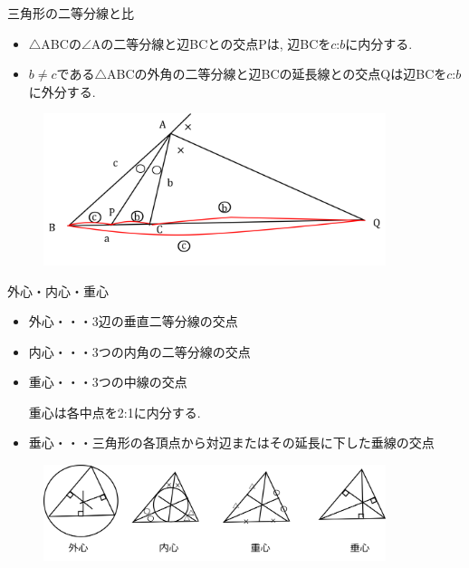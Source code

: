 \documentclass[aspectratio=169, 12pt]{beamer} %
\begin{document}
\begin{frame}{三角形の二等分線と比}
    \begin{itemize}
        \item $\triangle $ABCの$\angle $Aの二等分線と辺BCとの交点Pは, 辺BCを$c$\space:\space$b$に内分する.
        \item $b\neq c$である$\triangle $ABCの外角の二等分線と辺BCの延長線との交点Qは辺BCを$c$\space:\space$b$に外分する.
    \end{itemize}
    \begin{figure}[htbp]
        \begin{center}
            \includegraphics[width=100mm]{fig/1.png}
        \end{center}
    \end{figure}
\end{frame}
\begin{frame}{外心・内心・重心}
    \begin{itemize}
        \item 外心・・・3辺の垂直二等分線の交点
        \item 内心・・・3つの内角の二等分線の交点
        \item 重心・・・3つの中線の交点 \par
              重心は各中点を2\space:\space1に内分する.
        \item 垂心・・・三角形の各頂点から対辺またはその延長に下した垂線の交点
    \end{itemize}
    \begin{figure}[htbp]
        \begin{center}
            \includegraphics[width=100mm]{fig/2.png}
        \end{center}
    \end{figure}
\end{frame}
\end{document}
